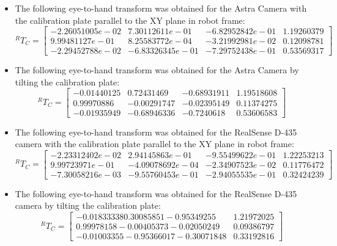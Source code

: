 \begin{itemize}
\item The following eye-to-hand transform was obtained for the Astra Camera with the calibration plate parallel to the XY plane in robot frame:
\begin{equation}
^{R}T_{C}=\begin{bmatrix} -2.26051005e-02 & 7.30112611e-01 & -6.82952842e-01 & 1.19260379\\9.99481127e-01 & 8.25583772e-04 & -3.21992981e-02 & 0.12098781\\ -2.29452788e-02 & -6.83326345e-01 & -7.29752438e-01 & 0.53569317 \end{bmatrix}
\end{equation}

\item The following eye-to-hand transform was obtained for the Astra Camera by tilting the calibration plate:
\begin{equation}
^{R}T_{C}=\begin{bmatrix} -0.01440125 & 0.72431469 & -0.68931911 & 1.19518608\\0.99970886 & -0.00291747 & -0.02395149 & 0.11374275\\ -0.01935949 & -0.68946336 & -0.7240618 & 0.53606583 \end{bmatrix}
\end{equation}


\item The following eye-to-hand transform was obtained for the RealSense D-435 camera with the calibration plate parallel to the XY plane in robot frame:
\begin{equation}
^{R}T_{C}=\begin{bmatrix} -2.23312402e-02 & 2.94145863e-01 & -9.55499622e-01 &1.22253213\\9.99723971e-01 & -4.09078692e-04 & -2.34907523e-02 & 0.11776472 \\ -7.30058216e-03 & -9.55760453e-01 & -2.94055535e-01 & 0.32424239  \end{bmatrix}
\end{equation}

\item The following eye-to-hand transform was obtained for the RealSense D-435 camera by tilting the calibration plate:
\begin{equation}
^{R}T_{C}=\begin{bmatrix} -0.01833338  0.30085851 -0.95349255 & 1.21972025\\0.99978158 -0.00405373 -0.02050249& 0.09386797\\ -0.01003355 -0.95366017 -0.30071848& 0.33192816\end{bmatrix}
\end{equation}
\end{itemize}

